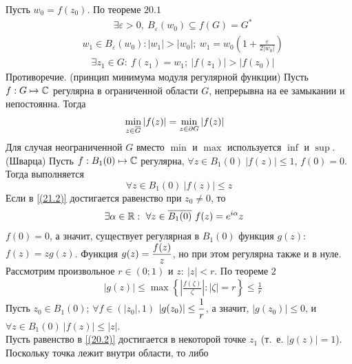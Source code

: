 Пусть $w_0 = f(z_0)$. По теореме $20.1$
\begin{align*}
  & \exists \varepsilon > 0, \ B_\varepsilon(w_0) \subseteq f(G) = G^*
\end{align*}
\begin{align*}
  & w_1 \in B_\varepsilon(w_0): \left| w_1 \right| > \left| w_0 \right|; \ w_1 = w_0\left( 1+\frac{\varepsilon}{2\left| w_0 \right|} \right)
\end{align*}
\begin{align*}
  & \exists z_1 \in G: \ f(z_1) = w_1; \ \left| f(z_1) \right| > \left| f(z_0) \right|
\end{align*}
Противоречие.
\corollary (принцип минимума модуля регулярной функции)
Пусть $f: G \mapsto \mathbb{C}$ регулярна в ограниченной области $G$, непрерывна на ее
замыкании и непостоянна. Тогда
\begin{align*}
  & \min_{z \in \overline{G}} \left| f(z) \right| = \min_{z \in \partial G} \left| f(z) \right|
\end{align*}
\Note
Для случая неограниченной $G$ вместо $\min$ и $\max$ используется $\inf$ и
$\sup$.
\lemma (Шварца)
Пусть $f: B_1(0) \mapsto \mathbb{C}$ регулярна, $\forall z \in B_1(0) \ \left| f(z)
\right| \leq 1$, $f(0) = 0$. Тогда выполняется
\begin{equation}\label{(21.2)}
    \forall z \in B_1(0) \ \left| f(z) \right| \leq z
\end{equation}
Если в \eqref{(21.2)} достигается равенство при $z_0 \neq 0$, то
\begin{align*}
  & \exists \alpha \in \mathbb{R}: \ \forall z \in \overline{B_1(0)} \ f(z) = e^{i\alpha}z
\end{align*}
\pr
$f(0) = 0$, а значит, существует регулярная в $B_1(0)$ функция $g(z)$: $f(z) =
zg(z)$. Функция $g(z) = \displaystyle \frac{f(z)}{z}$, но при этом регулярна также и в
нуле.
\\
Рассмотрим произвольное $r \in (0;1)$ и $z: \ \left| z \right|<r$. По теореме
$2$
\begin{align*}
  & \left| g(z) \right| \leq \max \left\{ \left| \frac{f(\zeta)}{\zeta} \right| : \left| \zeta \right| =r \right\} \leq \frac{1}{r}
\end{align*}
Пусть $z_0 \in B_1(0)$; $\forall f \in (\left| z_0 \right|, 1)$ $\left| g(z_0)
\right| \leq \displaystyle \frac{1}{r}$, а значит, $\left| g(z_0) \right|\leq 0$, и
$\forall z \in B_1(0) \ \left| f(z) \right|\leq \left| z \right|$.
\\
Пусть равенство в \eqref{(20.2)} достигается в некоторой точке $z_1$ (т.~е.
$\left| g(z) \right| = 1$). Поскольку точка лежит внутри области, то либо
